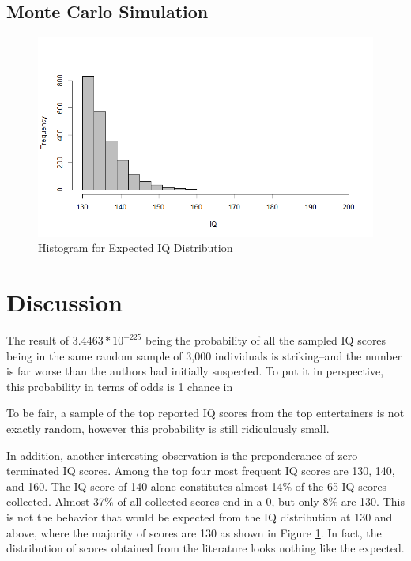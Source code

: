 \documentclass[12pt,letterpaper,titlepage,oneside]{article}
\begin{document}
\subsection{Monte Carlo Simulation}
\begin{figure}[h!]
\caption{Histogram for Expected IQ Distribution}
\label{iqhist}
\includegraphics[scale=.5]{expected-above-average}
\end{figure}

\section{Discussion}
The result of $3.4463 * 10^{-225}$ being the probability of all the sampled IQ scores being in the same random sample of 3,000 individuals is striking--and the number is far worse than the authors had initially suspected. To put it in perspective, this probability in terms of odds is 1 chance in
\begin{quote}

\end{quote} 
To be fair, a sample of the top reported IQ scores from the top entertainers is not exactly random, however this probability is still ridiculously small.

In addition, another interesting observation is the preponderance of zero-terminated IQ scores. Among the top four most frequent IQ scores are 130, 140, and 160. The IQ score of 140 alone constitutes almost 14\% of the 65 IQ scores collected. Almost 37\% of all collected scores end in a 0, but only 8\% are 130. This is not the behavior that would be expected from the IQ distribution at 130 and above, where the majority of scores are 130 as shown in Figure \ref{iqhist}. In fact, the distribution of scores obtained from the literature looks nothing like the expected.
\end{document}
